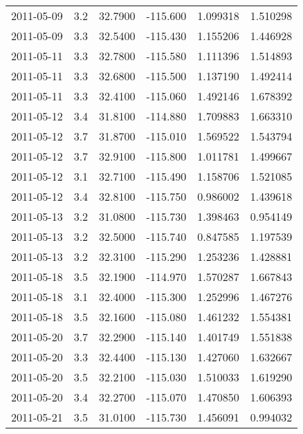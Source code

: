 \begin{tabular}{lrrrrr}
2011-05-09 &       3.2 &  32.7900 &  -115.600 &         1.099318 &         1.510298 \\
2011-05-09 &       3.3 &  32.5400 &  -115.430 &         1.155206 &         1.446928 \\
2011-05-11 &       3.3 &  32.7800 &  -115.580 &         1.111396 &         1.514893 \\
2011-05-11 &       3.3 &  32.6800 &  -115.500 &         1.137190 &         1.492414 \\
2011-05-11 &       3.3 &  32.4100 &  -115.060 &         1.492146 &         1.678392 \\
2011-05-12 &       3.4 &  31.8100 &  -114.880 &         1.709883 &         1.663310 \\
2011-05-12 &       3.7 &  31.8700 &  -115.010 &         1.569522 &         1.543794 \\
2011-05-12 &       3.7 &  32.9100 &  -115.800 &         1.011781 &         1.499667 \\
2011-05-12 &       3.1 &  32.7100 &  -115.490 &         1.158706 &         1.521085 \\
2011-05-12 &       3.4 &  32.8100 &  -115.750 &         0.986002 &         1.439618 \\
2011-05-13 &       3.2 &  31.0800 &  -115.730 &         1.398463 &         0.954149 \\
2011-05-13 &       3.2 &  32.5000 &  -115.740 &         0.847585 &         1.197539 \\
2011-05-13 &       3.2 &  32.3100 &  -115.290 &         1.253236 &         1.428881 \\
2011-05-18 &       3.5 &  32.1900 &  -114.970 &         1.570287 &         1.667843 \\
2011-05-18 &       3.1 &  32.4000 &  -115.300 &         1.252996 &         1.467276 \\
2011-05-18 &       3.5 &  32.1600 &  -115.080 &         1.461232 &         1.554381 \\
2011-05-20 &       3.7 &  32.2900 &  -115.140 &         1.401749 &         1.551838 \\
2011-05-20 &       3.3 &  32.4400 &  -115.130 &         1.427060 &         1.632667 \\
2011-05-20 &       3.5 &  32.2100 &  -115.030 &         1.510033 &         1.619290 \\
2011-05-20 &       3.4 &  32.2700 &  -115.070 &         1.470850 &         1.606393 \\
2011-05-21 &       3.5 &  31.0100 &  -115.730 &         1.456091 &         0.994032 \\

\end{tabular}
